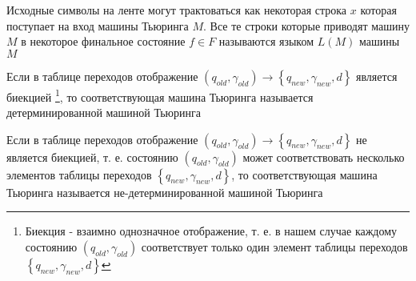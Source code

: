 \begin{definition}
Исходные символы на ленте могут трактоваться как некоторая строка $x$
которая поступает на вход машины Тьюринга $M$. Все те строки которые
приводят машину $M$ в некоторое финальное состояние $f \in F$
называются языком $L\left(M\right)$ машины $M$
\end{definition}

\begin{definition}
Если в таблице переходов отображение
\(
\left(q_{old}, \gamma_{old}\right) \rightarrow 
\left\{q_{new}, \gamma_{new}, d\right\}
\)
является биекцией 
\footnote{Биекция - взаимно однозначное отображение, т. е. в нашем
  случае каждому состоянию $\left(q_{old}, \gamma_{old}\right)$
  соответствует только один элемент таблицы переходов 
  $\left\{q_{new}, \gamma_{new}, d\right\}$
},
то соответствующая машина Тьюринга
называется детерминированной машиной Тьюринга
\label{defAlgoDMT}
\end{definition}

\begin{definition}
Если в таблице переходов отображение
\(
\left(q_{old}, \gamma_{old}\right) \rightarrow 
\left\{q_{new}, \gamma_{new}, d\right\}
\)
не является биекцией, т. е. состоянию $\left(q_{old}, \gamma_{old}\right)$
может соответствовать несколько элементов таблицы переходов 
$\left\{q_{new}, \gamma_{new}, d\right\}$,
то соответствующая машина Тьюринга
называется не-детерминированной машиной Тьюринга
\label{defAlgoNDMT}
\end{definition}

